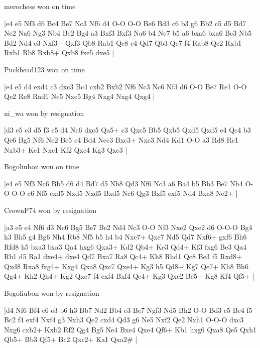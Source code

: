 \showboard

merochess won on time

\makegametitle
|e4 e5 Nf3 d6 Bc4 Be7 Nc3 Nf6 d4 O-O O-O Be6 Bd3 c6 b3 g6 Bb2 c5 d5 Bd7 Ne2 Na6 Ng3 Nb4 Be2 Bg4 a3 Bxf3 Bxf3 Na6 b4 Nc7 b5 a6 bxa6 bxa6 Bc3 Nb5 Bd2 Nd4 c3 Nxf3+ Qxf3 Qb8 Rab1 Qc8 c4 Qd7 Qb3 Qc7 f4 Rab8 Qc2 Rxb1 Rxb1 Rb8 Rxb8+ Qxb8 fxe5 dxe5  |

\showboard

Puckhead123 won on time

\makegametitle
|e4 e5 d4 exd4 c3 dxc3 Bc4 cxb2 Bxb2 Nf6 Nc3 Nc6 Nf3 d6 O-O Be7 Re1 O-O Qe2 Re8 Rad1 Ne5 Nxe5 Bg4 Nxg4 Nxg4 Qxg4  |

\showboard

ni\_wa won by resignation

\makegametitle
|d3 e5 e3 d5 f3 c5 d4 Nc6 dxc5 Qa5+ c3 Qxc5 Bb5 Qxb5 Qxd5 Qxd5 e4 Qc4 b3 Qe6 Bg5 Nf6 Ne2 Bc5 c4 Bd4 Nec3 Bxc3+ Nxc3 Nd4 Kd1 O-O a3 Rd8 Rc1 Nxb3+ Ke1 Nxc1 Kf2 Qxc4 Kg3 Qxc3  |

\showboard

Bogoliubon won on time

\makegametitle
|e4 e5 Nf3 Nc6 Bb5 d6 d4 Bd7 d5 Nb8 Qd3 Nf6 Nc3 a6 Ba4 b5 Bb3 Be7 Nh4 O-O O-O c6 Nf5 cxd5 Nxd5 Nxd5 Bxd5 Nc6 Qg3 Bxf5 exf5 Nd4 Bxa8 Ne2+  |

\showboard

CrownP74 won by resignation

\makegametitle
|a3 e5 e4 Nf6 d3 Nc6 Bg5 Be7 Be2 Nd4 Nc3 O-O Nf3 Nxe2 Qxe2 d6 O-O-O Bg4 h3 Bh5 g4 Bg6 Nh4 Rb8 Nf5 b5 h4 b4 Nxe7+ Qxe7 Nd5 Qd7 Nxf6+ gxf6 Bh6 Rfd8 h5 bxa3 bxa3 Qa4 hxg6 Qxa3+ Kd2 Qb4+ Ke3 Qd4+ Kf3 fxg6 Be3 Qa4 Rb1 d5 Ra1 dxe4+ dxe4 Qd7 Bxa7 Ra8 Qc4+ Kh8 Rhd1 Qc8 Be3 f5 Rxd8+ Qxd8 Rxa8 fxg4+ Kxg4 Qxa8 Qxc7 Qxe4+ Kg3 h5 Qd8+ Kg7 Qe7+ Kh8 Bh6 Qg4+ Kh2 Qh4+ Kg2 Qxe7 f4 exf4 Bxf4 Qe4+ Kg3 Qxc2 Be5+ Kg8 Kf4 Qf5+  |

\showboard

Bogoliubon won by resignation

\makegametitle
|d4 Nf6 Bf4 e6 e3 b6 h3 Bb7 Nd2 Bb4 c3 Be7 Ngf3 Nd5 Bh2 O-O Bd3 c5 Be4 f5 Bc2 f4 exf4 Nxf4 g3 Nxh3 Qe2 cxd4 Qd3 g6 Ne5 Nxf2 Qe2 Nxh1 O-O-O dxc3 Nxg6 cxb2+ Kxb2 Rf2 Qg4 Bg5 Ne4 Bxe4 Qxe4 Qf6+ Kb1 hxg6 Qxa8 Qe5 Qxh1 Qb5+ Bb3 Qf5+ Bc2 Qxc2+ Ka1 Qxa2\#  |

